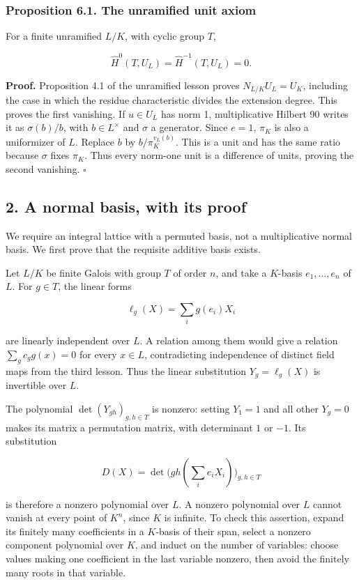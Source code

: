 \documentclass[11pt,a4paper]{article}
\begin{document}
\subsubsection{Proposition 6.1. The unramified unit
axiom}\label{proposition-6.1.-the-unramified-unit-axiom}

For a finite unramified \(L/K\), with cyclic group \(T\),

\[
\widehat H^0(T,U_L)=\widehat H^{-1}(T,U_L)=0.
\tag{3}
\]

\textbf{Proof.} Proposition 4.1 of the unramified lesson proves
\(N_{L/K}U_L=U_K\), including the case in which the residue
characteristic divides the extension degree. This proves the first
vanishing. If \(u\in U_L\) has norm 1, multiplicative Hilbert 90 writes
it as \(\sigma(b)/b\), with \(b\in L^\times\) and \(\sigma\) a
generator. Since \(e=1\), \(\pi_K\) is also a uniformizer of \(L\).
Replace \(b\) by \(b/\pi_K^{v_L(b)}\). This is a unit and has the same
ratio because \(\sigma\) fixes \(\pi_K\). Thus every norm-one unit is a
difference of units, proving the second vanishing. \(\square\)

\subsection{2. A normal basis, with its
proof}\label{a-normal-basis-with-its-proof}

We require an integral lattice with a permuted basis, not a
multiplicative normal basis. We first prove that the requisite additive
basis exists.

Let \(L/K\) be finite Galois with group \(T\) of order \(n\), and take a
\(K\)-basis \(e_1,\ldots,e_n\) of \(L\). For \(g\in T\), the linear
forms

\[
\ell_g(X)=\sum_i g(e_i)X_i
\]

are linearly independent over \(L\). A relation among them would give a
relation \(\sum_g c_g g(x)=0\) for every \(x\in L\), contradicting
independence of distinct field maps from the third lesson. Thus the
linear substitution \(Y_g=\ell_g(X)\) is invertible over \(L\).

The polynomial \(\det(Y_{gh})_{g,h\in T}\) is nonzero: setting \(Y_1=1\)
and all other \(Y_g=0\) makes its matrix a permutation matrix, with
determinant \(1\) or \(-1\). Its substitution

\[
D(X)=\det\bigl(gh(\textstyle\sum_i e_iX_i)\bigr)_{g,h\in T}
\]

is therefore a nonzero polynomial over \(L\). A nonzero polynomial over
\(L\) cannot vanish at every point of \(K^n\), since \(K\) is infinite.
To check this assertion, expand its finitely many coefficients in a
\(K\)-basis of their span, select a nonzero component polynomial over
\(K\), and induct on the number of variables: choose values making one
coefficient in the last variable nonzero, then avoid the finitely many
roots in that variable.
\end{document}
